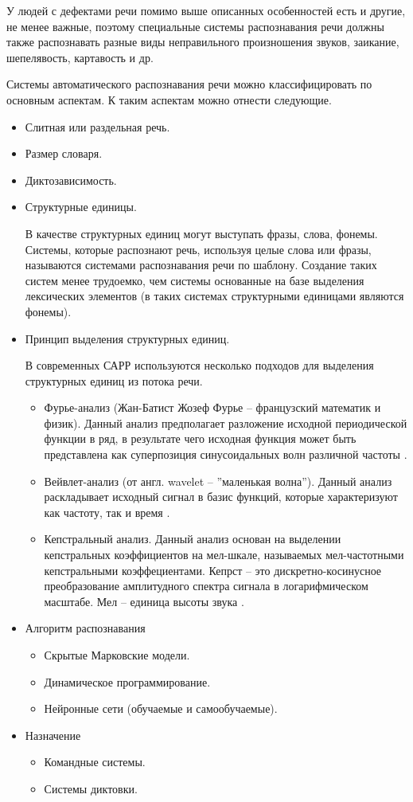 У людей с дефектами речи помимо выше описанных особенностей есть и другие, не менее важные, поэтому специальные системы распознавания речи должны также распознавать разные виды неправильного произношения звуков, заикание, шепелявость, картавость и др.

Системы автоматического распознавания речи можно классифицировать по основным аспектам. К таким аспектам можно отнести следующие.
\begin{itemize}
	\item Слитная или раздельная речь.
	\item Размер словаря.
	\item Диктозависимость.
	\item Структурные единицы. 
	
	В качестве структурных единиц могут выступать фразы, слова, фонемы. Системы, которые распознают речь, используя целые слова или фразы, называются системами распознавания речи по шаблону. Создание таких систем менее трудоемко, чем системы основанные на базе выделения лексических элементов (в таких системах структурными единицами являются фонемы). 
	
	\item Принцип выделения структурных единиц.
	
		В современных САРР используются несколько подходов для выделения структурных единиц из потока речи. 
		\begin{itemize}
			\item Фурье-анализ (Жан-Батист Жозеф Фурье -- французский математик и физик). Данный анализ предполагает разложение исходной периодической функции в ряд, в результате чего исходная функция может быть представлена как суперпозиция синусоидальных волн различной частоты \cite{fur_veivlet}.
			\item Вейвлет-анализ (от англ. wavelet -- ''маленькая волна''). Данный анализ раскладывает исходный сигнал в базис функций, которые характеризуют как частоту, так и время \cite{fur_veivlet}.
			\item Кепстральный анализ. Данный анализ основан на выделении кепстральных коэффициентов на мел-шкале, называемых мел-частотными кепстральными коэффециентами. Кепрст -- это дискретно-косинусное преобразование амплитудного спектра сигнала в логарифмическом масштабе. Мел -- единица высоты звука \cite{kepstr}.
		\end{itemize}
	\item Алгоритм распознавания
		\begin{itemize}
			\item Скрытые Марковские модели.
			\item Динамическое программирование.
			\item Нейронные сети (обучаемые и самообучаемые).
		\end{itemize}
	\item Назначение
		\begin{itemize}
			\item Командные системы.
			\item Системы диктовки.
		\end{itemize}
\end{itemize}